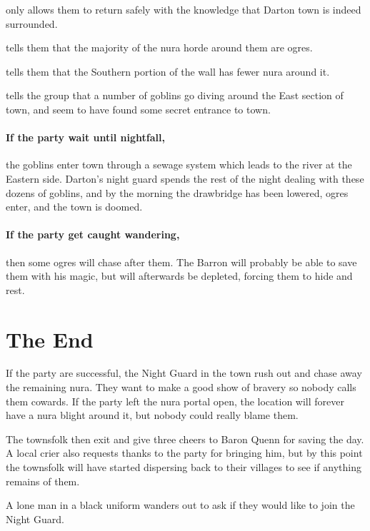 \begin{multicols}{2}
\setcounter{list}{-1}
\begin{list}{\addtocounter{list}{1}\textbf{Margin }:}{\raggedleft}

  \item{only allows them to return safely with the knowledge that Darton town is indeed surrounded.}
  \item{tells them that the majority of the nura horde around them are ogres.}
  \item{tells them that the Southern portion of the wall has fewer nura around it.}
  \item{tells the group that a number of goblins go diving around the East section of town, and seem to have found some secret entrance to town.}
\end{list}

\paragraph{If the party wait until nightfall,}
the goblins enter town through a sewage system which leads to the river at the Eastern side.
Darton's night guard spends the rest of the night dealing with these dozens of goblins, and by the morning the drawbridge has been lowered, ogres enter, and the town is doomed.

\paragraph{If the party get caught wandering,}
then some ogres will chase after them.
The Barron will probably be able to save them with his magic, but will afterwards be depleted, forcing them to hide and rest.

\ogre

\end{multicols}

\section{The End}

\begin{multicols}{2}

\noindent
If the party are successful, the Night Guard in the town rush out and chase away the remaining nura.
They want to make a good show of bravery so nobody calls them cowards.
If the party left the nura portal open, the location will forever have a nura blight around it, but nobody could really blame them.%

The townsfolk then exit and give three cheers to Baron Quenn for saving the day.
A local crier also requests thanks to the party for bringing him, but by this point the townsfolk will have started dispersing back to their villages to see if anything remains of them.

A lone man in a black uniform wanders out to ask if they would like to join the Night Guard.

\end{multicols}
